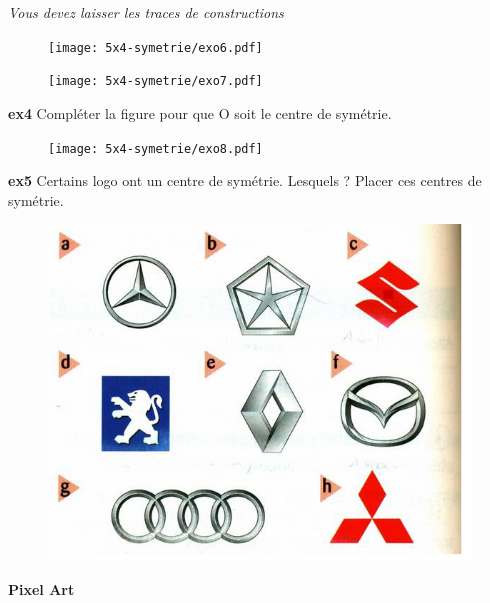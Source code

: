 \textit{Vous devez laisser les traces de constructions}

\begin{minipage}[t]{0.50\textwidth}

\begin{figure}[H]
  \centering
  \texttt{[image: 5x4-symetrie/exo6.pdf]}
\end{figure}

\end{minipage}
\begin{minipage}[t]{0.50\textwidth}

\begin{figure}[H]
  \centering
  \texttt{[image: 5x4-symetrie/exo7.pdf]}
\end{figure}

\end{minipage}

\newpage

\textbf{ex4} Compléter la figure pour que O soit le centre de symétrie.

\begin{figure}[H]
  \centering
  \texttt{[image: 5x4-symetrie/exo8.pdf]}
\end{figure}

\textbf{ex5} Certains logo ont un centre de symétrie. Lesquels ? Placer ces centres de symétrie.

\begin{figure}[H]
  \centering
  \includegraphics[width=0.6\linewidth]{5x4-symetrie/exo9.png}
\end{figure}

\textbf{Pixel Art} 

